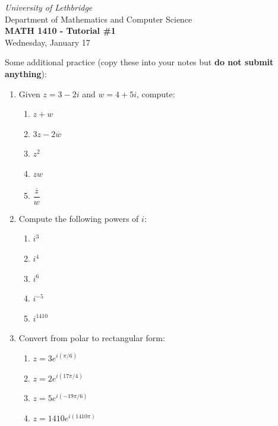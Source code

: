 \documentclass[12pt]{article}
\newcommand{\skipline}{\vspace{12pt}}
\begin{document}
\author{Instructor: Sean Fitzpatrick}
\thispagestyle{empty}
\begin{center}
\emph{University of Lethbridge}\\
Department of Mathematics and Computer Science\\
{\bf MATH 1410 - Tutorial \#1}\\
Wednesday, January 17
\end{center}
\skipline \skipline \skipline \noindent \skipline

\vspace*{\fill}



Some additional practice (copy these into your notes but \textbf{do not submit anything}):
\begin{enumerate}
\item Given $z=3-2i$ and $w=4+5i$, compute:
\begin{multicols}{5}
\begin{enumerate}
\item $z+w$
\item $3z-2\overline{w}$
\item $z^2$
\item $zw$
\item $\dfrac{\overline{z}}{w}$
\end{enumerate}
\end{multicols}

\item Compute the following powers of $i$:
\begin{multicols}{5}
\begin{enumerate}
\item $i^3$ \item $i^4$ \item $i^6$ \item $i^{-5}$ \item $i^{1410}$
\end{enumerate}
\end{multicols}
\item Convert from polar to rectangular form:
\begin{multicols}{4}
\begin{enumerate}
\item $z=3e^{i(\pi/6) } $ 
\item $z= 2e^{i(17\pi/4) }$ \item $z=5e^{i(-19\pi/6)}$ \item $z=1410e^{i(1410\pi) }$
\end{enumerate}
\end{multicols}
\end{enumerate}
\end{document}
